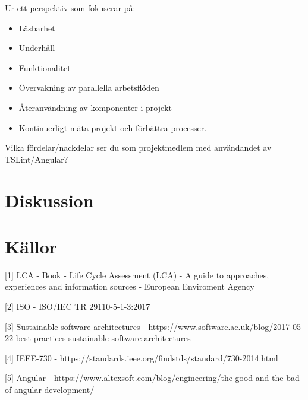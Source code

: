 Ur ett perspektiv som fokuserar på: 
\begin{itemize}
	\item Läsbarhet 
	\item Underhåll
	\item Funktionalitet
	\item Övervakning av parallella arbetsflöden
	\item Återanvändning av komponenter i projekt
	\item Kontinuerligt mäta projekt och förbättra processer.
\end{itemize}

Vilka fördelar/nackdelar ser du som projektmedlem med användandet av TSLint/Angular?


\section{Diskussion}


\section{Källor}

[1] LCA - Book - Life Cycle Assessment (LCA) - A guide to approaches, experiences and information sources - European Enviroment Agency 

[2] ISO - ISO/IEC TR 29110-5-1-3:2017 

[3] Sustainable software-architectures -  https://www.software.ac.uk/blog/2017-05-22-best-practices-sustainable-software-architectures 

[4] IEEE-730 - https://standards.ieee.org/findstds/standard/730-2014.html 

[5] Angular - https://www.altexsoft.com/blog/engineering/the-good-and-the-bad-of-angular-development/ 


